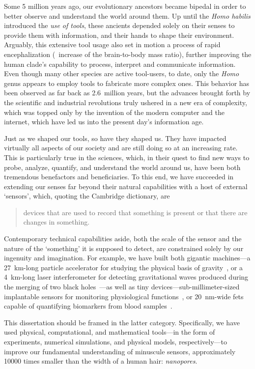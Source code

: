 Some 5 million years ago, our evolutionary ancestors became bipedal in order to better observe and understand
the world around them. Up until the \textit{Homo habilis} introduced the \emph{use of tools}, these ancients
depended solely on their senses to provide them with information, and their hands to shape their environment.
Arguably, this extensive tool usage also set in motion a process of rapid encephalization (\ie~increase of the
brain-to-body mass ratio), further improving the human clade's capability to process, interpret and
communicate information. Even though many other species are active tool-users, to date, only the \textit{Homo}
genus appears to employ tools to fabricate more complex ones. This behavior has been observed as far back as
2.6~million years, but the advances brought forth by the scientific and industrial revolutions truly ushered
in a new era of complexity, which was topped only by the invention of the modern computer and the internet,
which have led us into the present day's information age.

Just as we shaped our tools, so have they shaped us. They have impacted virtually all aspects of our society
and are still doing so at an increasing rate. This is particularly true in the sciences, which, in their quest
to find new ways to probe, analyze, quantify, and understand the world around us, have been both tremendous
benefactors and beneficiaries. To this end, we have succeeded in extending our senses far beyond their natural
capabilities with a host of external `sensors', which, quoting the Cambridge dictionary, are
%
\begin{quote}
  devices that are used to record that something is present or that there are changes in something.
\end{quote}
%
Contemporary technical capabilities aside, both the scale of the sensor and the nature of the `something' it
is supposed to detect, are constrained solely by our ingenuity and imagination. For example, we have built
both gigantic machines---a \SI{27}{\kilo\meter}-long particle accelerator for studying the physical basis of
gravity~\cite{ATLAS-2012}, or a \SI{4}{\kilo\meter}-long laser interferometer for detecting gravitational
waves produced during the merging of two black holes~\cite{Abbott-2016}---as well as tiny
devices---sub-millimeter-sized implantable sensors for monitoring physiological functions~\cite{Dong-2019}, or
\SI{20}{\nm}-wide \glspl{fet} capable of quantifying biomarkers from blood samples~\cite{Krivitsky-2016}.

This dissertation should be framed in the latter category. Specifically, we have used physical, computational,
and mathematical tools---in the form of experiments, numerical simulations, and physical models,
respectively---to improve our fundamental understanding of minuscule sensors, approximately \num{10000} times
smaller than the width of a human hair: \emph{nanopores}.


